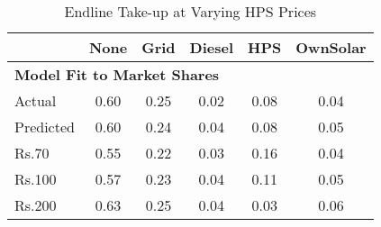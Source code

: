 \begin{table}[htbp]\centering
\caption{Endline Take-up at Varying HPS Prices\label {tab1}}
\begin{tabular}{l*{5}{c}}
\toprule
            &        None&        Grid&      Diesel&         HPS&    OwnSolar\\
\midrule
\multicolumn{6}{l}{\textbf{Model Fit to Market Shares}} \\ %
Actual      &        0.60&        0.25&        0.02&        0.08&        0.04\\
Predicted   &        0.60&        0.24&        0.04&        0.08&        0.05\\
Rs.70       &        0.55&        0.22&        0.03&        0.16&        0.04\\
Rs.100      &        0.57&        0.23&        0.04&        0.11&        0.05\\
Rs.200      &        0.63&        0.25&        0.04&        0.03&        0.06\\
\bottomrule

\end{tabular}
\end{table}
